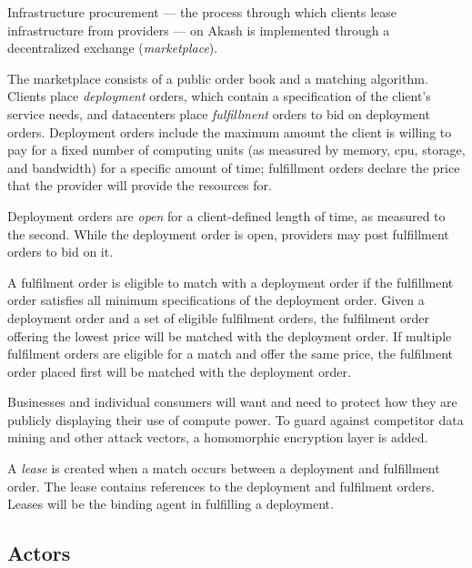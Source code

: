 \documentclass[11pt,english]{article}
\theoremstyle{definition}
\begin{document}
Infrastructure procurement --- the process through which clients lease infrastructure from providers --- on Akash is implemented through a decentralized exchange (\textit{marketplace}).

The marketplace consists of a public order book and a matching algorithm. Clients place \textit{deployment} orders, which contain a specification of the client's service needs, and datacenters place \textit{fulfillment} orders to bid on deployment orders. Deployment orders include the maximum amount the client is willing to pay for a fixed number of computing units (as measured by memory, cpu, storage, and bandwidth) for a specific amount of time; fulfillment orders declare the price that the provider will provide the resources for.

Deployment orders are \textit{open} for a client-defined length of time, as measured to the second. While the deployment order is open, providers may post fulfillment orders to bid on it.

A fulfilment order is eligible to match with a deployment order if the fulfillment order satisfies all minimum specifications of the deployment order. Given a deployment order and a set of eligible fulfilment orders, the fulfilment order offering the lowest price will be matched with the deployment order. If multiple fulfilment orders are eligible for a match and offer the same price, the fulfilment order placed first will be matched with the deployment order.

Businesses and individual consumers will want and need to protect how they are publicly displaying their use of compute power. To guard against competitor data mining and other attack vectors, a homomorphic encryption layer is added. 

A \textit{lease} is created when a match occurs between a deployment and fulfillment order. The lease contains references to the deployment and fulfilment orders. Leases will be the binding agent in fulfilling a deployment. 

\subsection{Actors}
\end{document}
